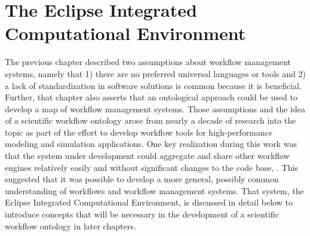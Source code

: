 \chapter{The Eclipse Integrated Computational Environment} \label{ch:eclipse-ice}

The previous chapter described two assumptions about workflow management
systems, namely that 1) there are no preferred universal languages or tools
and 2) a lack of standardization in software solutions is common because it is
beneficial. Further, that chapter also asserts that an ontological approach
could be used to develop a map of workflow management systems. Those assumptions
and the idea of a scientific workflow ontology arose from nearly a decade of
research into the topic as part of the effort to develop workflow tools for
high-performance modeling and simulation applications. One key realization
during this work was that the system under development could aggregate and share
other workflow engines relatively easily and without significant changes to the
code base, \cite{brooks_introducing_2016}. This suggested that it was possible
to develop a more general, possibly common understanding of workflows and
workflow management systems. That system, the Eclipse Integrated Computational
Environment, is discussed in detail below to introduce concepts that will be
necessary in the development of a scientific workflow ontology in later
chapters.

